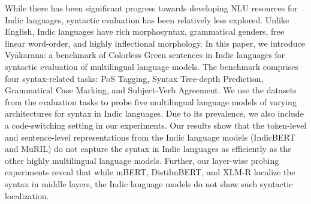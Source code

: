 While there has been significant progress towards developing NLU resources for Indic languages, syntactic evaluation has been relatively less explored. Unlike English, Indic languages have rich morphosyntax, grammatical genders, free linear word-order, and highly inflectional morphology. In this paper, we introduce Vyākarana: a benchmark of Colorless Green sentences in Indic languages for syntactic evaluation of multilingual language models. The benchmark comprises four syntax-related tasks: PoS Tagging, Syntax Tree-depth Prediction, Grammatical Case Marking, and Subject-Verb Agreement. We use the datasets from the evaluation tasks to probe five multilingual language models of varying architectures for syntax in Indic languages. Due to its prevalence, we also include a code-switching setting in our experiments. Our results show that the token-level and sentence-level representations from the Indic language models (IndicBERT and MuRIL) do not capture the syntax in Indic languages as efficiently as the other highly multilingual language models. Further, our layer-wise probing experiments reveal that while mBERT, DistilmBERT, and XLM-R localize the syntax in middle layers, the Indic language models do not show such syntactic localization.
